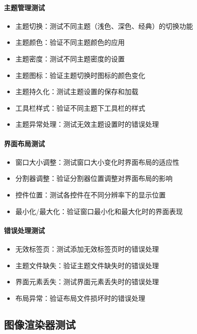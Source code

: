 \documentclass[a4paper,12pt]{report}	%
\begin{document}
\paragraph{主题管理测试}
\begin{itemize}
    \item 主题切换：测试不同主题（浅色、深色、经典）的切换功能
    \item 主题颜色：验证不同主题颜色的应用
    \item 主题密度：测试不同主题密度的设置
    \item 主题图标：验证主题切换时图标的颜色变化
    \item 主题持久化：测试主题设置的保存和加载
    \item 工具栏样式：验证不同主题下工具栏的样式
    \item 主题异常处理：测试无效主题设置时的错误处理
\end{itemize}

\paragraph{界面布局测试}
\begin{itemize}
    \item 窗口大小调整：测试窗口大小变化时界面布局的适应性
    \item 分割器调整：验证分割器位置调整对界面布局的影响
    \item 控件位置：测试各控件在不同分辨率下的显示位置
    \item 最小化/最大化：验证窗口最小化和最大化时的界面表现
\end{itemize}

\paragraph{错误处理测试}
\begin{itemize}
    \item 无效标签页：测试添加无效标签页时的错误处理
    \item 主题文件缺失：验证主题文件缺失时的错误处理
    \item 界面元素丢失：测试界面元素丢失时的错误处理
    \item 布局异常：验证布局文件损坏时的错误处理
\end{itemize}

\subsection{图像渲染器测试}
\end{document}
